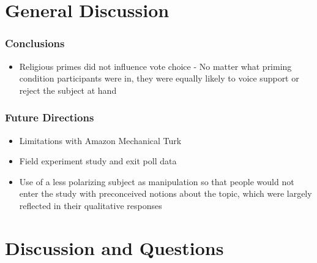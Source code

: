 \documentclass[14pt]{beamer}
\begin{document}
\section{General Discussion}

\begin{frame}
\frametitle{Conclusions}
\begin{itemize}
	\item Religious primes did not influence vote choice - No matter what priming condition participants were in, they were equally likely to voice support or reject the subject at hand
\end{itemize}
\end{frame}

\begin{frame}
\frametitle{Future Directions}
\begin{itemize}
	\item Limitations with Amazon Mechanical Turk 
	\item Field experiment study and exit poll data
	\item Use of a less polarizing subject as manipulation so that people would not enter the study with preconceived notions about the topic, which were largely reflected in their qualitative responses
\end{itemize}
\end{frame}

\section{Discussion and Questions}
\end{document}
